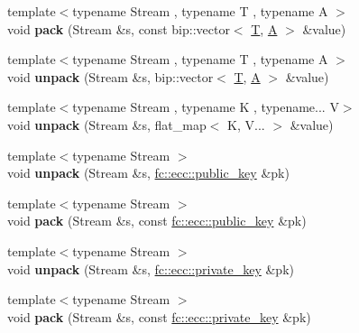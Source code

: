 \begin{DoxyCompactItemize}
\item 
\mbox{\label{namespacefc_1_1raw_a315d9586d843ac913f85e48151fdf889}} 
{\footnotesize template$<$typename Stream , typename T , typename A $>$ }\\void {\bfseries pack} (Stream \&s, const bip\+::vector$<$ \mbox{\hyperlink{struct_t}{T}}, \mbox{\hyperlink{struct_a}{A}} $>$ \&value)
\item 
\mbox{\label{namespacefc_1_1raw_a31a446c41eef62039490470e5d691e1a}} 
{\footnotesize template$<$typename Stream , typename T , typename A $>$ }\\void {\bfseries unpack} (Stream \&s, bip\+::vector$<$ \mbox{\hyperlink{struct_t}{T}}, \mbox{\hyperlink{struct_a}{A}} $>$ \&value)
\item 
\mbox{\label{namespacefc_1_1raw_a66f9e22086b669177f42b79bac3c6e27}} 
{\footnotesize template$<$typename Stream , typename K , typename... V$>$ }\\void {\bfseries unpack} (Stream \&s, flat\+\_\+map$<$ K, V... $>$ \&value)
\item 
\mbox{\label{namespacefc_1_1raw_a68ecd1a0fea178dfb381f2ce23d45c77}} 
{\footnotesize template$<$typename Stream $>$ }\\void {\bfseries unpack} (Stream \&s, \mbox{\hyperlink{classfc_1_1ecc_1_1public__key}{fc\+::ecc\+::public\+\_\+key}} \&pk)
\item 
\mbox{\label{namespacefc_1_1raw_a9eecb072d3a184c2d5dc19c6827135f7}} 
{\footnotesize template$<$typename Stream $>$ }\\void {\bfseries pack} (Stream \&s, const \mbox{\hyperlink{classfc_1_1ecc_1_1public__key}{fc\+::ecc\+::public\+\_\+key}} \&pk)
\item 
\mbox{\label{namespacefc_1_1raw_a8e8867758230bf90b637d0e46268f77e}} 
{\footnotesize template$<$typename Stream $>$ }\\void {\bfseries unpack} (Stream \&s, \mbox{\hyperlink{classfc_1_1ecc_1_1private__key}{fc\+::ecc\+::private\+\_\+key}} \&pk)
\item 
\mbox{\label{namespacefc_1_1raw_ad003e62682aaf0914bf58543033de1ae}} 
{\footnotesize template$<$typename Stream $>$ }\\void {\bfseries pack} (Stream \&s, const \mbox{\hyperlink{classfc_1_1ecc_1_1private__key}{fc\+::ecc\+::private\+\_\+key}} \&pk)

\end{DoxyCompactItemize}
